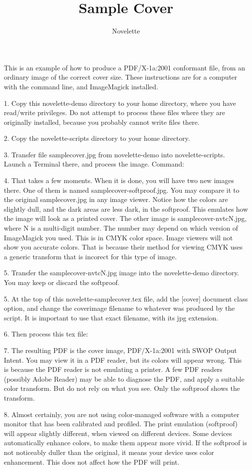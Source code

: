\documentclass{novelette} %
\title{Sample Cover}
\author{Novelette}
\begin{document}
This is an example of how to produce a PDF/X-1a:2001 conformant file,
from an ordinary image of the correct cover size. These instructions are
for a computer with the  command line, and ImageMagick installed.

1. Copy this novelette-demo directory to your home directory, where you
have read/write privileges. Do not attempt to process these files where
they are originally installed, because you probably cannot write files there.

2. Copy the novelette-scripts directory to your home directory.

3. Transfer file samplecover.jpg from novelette-demo into novelette-scripts.
Launch a Terminal there, and process the image. Command:


4. That takes a few moments. When it is done, you will have two new images
there. One of them is named samplecover-softproof.jpg. You may compare it
to the original samplecover.jpg in any image viewer. Notice how the colors
are slightly dull, and the dark areas are less dark, in the softproof.
This emulates how the image will look as a printed cover.
	The other image is samplecover-nvtcN.jpg, where N is a multi-digit number.
The number may depend on which version of ImageMagick you used. This is
in CMYK color space. Image viewers will not show you accurate colors.
That is because their method for viewing CMYK uses a generic transform that
is incorect for this type of image.

5. Transfer the samplecover-nvtcN.jpg image into the novelette-demo
directory. You may keep or discard the softproof.

5. At the top of this novelette-samplecover.tex file, add the [cover]
document class option, and change the coverimage filename to whatever was
produced by the script. It is important to use that exact filename, with its
jpg extension.

6. Then process this tex file:


\null

7. The resulting PDF is the cover image, PDF/X-1a:2001 with SWOP Output Intent.
You may view it in a PDF reader, but its colors will appear wrong.
This is because the PDF reader is not emulating a printer.
A few PDF readers (possibly Adobe Reader) may be able to diagnose the PDF,
and apply a suitable color transform.
But do not rely on what you see. Only the softproof shows the transform.

8. Almost certainly, you are not using color-managed software with a computer
monitor that has been calibrated and profiled. The print emulation (softproof)
will appear slightly different, when viewed on different devices. Some devices
automatically enhance colors, to make them appear more vivid.
If the softproof is not noticeably duller than the original,
it means your device uses color enhancement. This does not affect how the
PDF will print.

\makeatletter\nocle@rtoendtrue\makeatother
\end{document}
